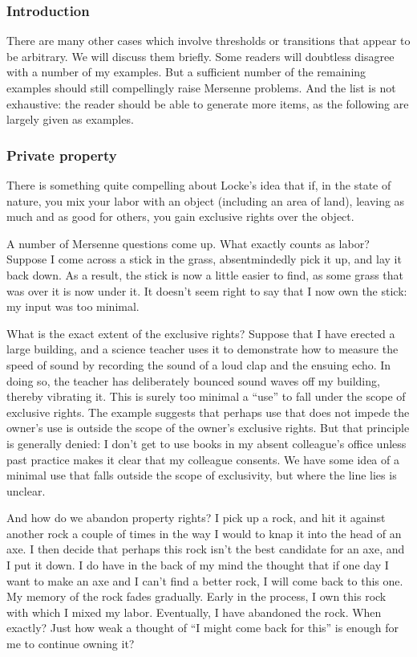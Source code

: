 \subsubsection{Introduction}
There are many other cases which involve thresholds or transitions that appear to be arbitrary. We will discuss them briefly.
Some readers will doubtless disagree with a number of my examples. But a sufficient number of the remaining examples 
should still compellingly raise Mersenne problems. And the list is not
exhaustive: the reader should be able to generate more items, as the following are largely given as examples.

\subsubsection{Private property}
There is something quite compelling about Locke's idea that if, in the state of nature, you mix your labor with 
an object (including an area of land), leaving as much and as good for others, you gain exclusive rights over 
the object. 

A number of Mersenne questions come up. What exactly counts as labor? Suppose I come across a stick in 
the grass, absentmindedly pick it up, and lay it back down. As a result, the stick is now a little easier to find, as 
some grass that was over it is now under it.  It doesn't seem right to say that I now own
the stick: my input was too minimal. 

What is the exact extent of the exclusive rights? Suppose that I have erected a large 
building, and a science teacher uses it to demonstrate how to measure the speed of sound by recording the sound of a loud 
clap and the ensuing echo. In doing so, the teacher has deliberately bounced sound waves off my building, thereby vibrating 
it. This is surely too minimal a ``use'' to fall under the scope of exclusive rights. The example suggests that perhaps use that 
does not impede the owner's use is outside the scope of the owner's exclusive rights. But that principle is generally 
denied: I don't get to use books in my absent colleague's office unless past practice makes it clear that my 
colleague consents. We have some idea of a minimal use that falls outside the scope of exclusivity, but where the 
line lies is unclear.

And how do we abandon property rights? I pick up a rock, and hit it against another rock a couple of times in the way
I would to knap it into the head of an axe. I then decide that perhaps this rock isn't the best candidate for an axe, and I
put it down. I do have in the back of my mind the thought that if one day I want to make an axe and I can't find a better 
rock, I will come back to this one. My memory of the rock fades gradually. Early in the process, I own this 
rock with which I mixed my labor. Eventually, I have abandoned the rock. When exactly? Just how weak a thought of ``I might 
come back for this'' is enough for me to continue owning it? 

